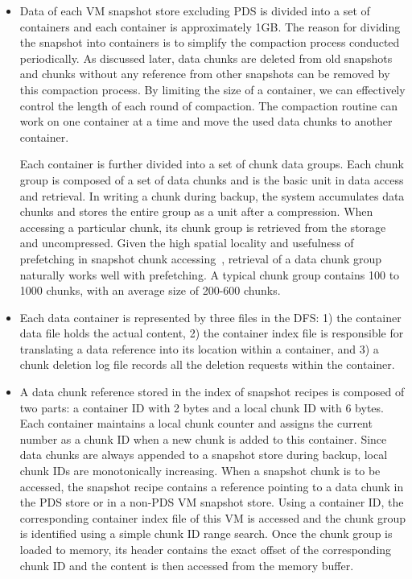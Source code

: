 \begin{itemize}
\item Data of each VM snapshot store excluding PDS is divided into a set of containers and 
each container is approximately 1GB. 
The reason for dividing the snapshot into containers is to simplify the compaction process
conducted periodically. As discussed later, data chunks are deleted from old snapshots
and chunks without any reference from other snapshots can be removed by this compaction process.
By limiting the size of a container, we can effectively control the length of each round of compaction.
The compaction  routine can work on one container at a time and move the used data chunks to another container. 

Each container is further divided into a set of chunk data groups. Each chunk group is composed of
a set of data chunks and is the basic unit in data access and retrieval. 
In writing a chunk during backup, the system accumulates data chunks and stores the entire
group as a unit after a compression.
When accessing a particular chunk, its chunk group is retrieved from the storage
and uncompressed. Given the high spatial locality and usefulness of prefetching  in 
snapshot chunk accessing~\cite{Guo2011,foundation08},
retrieval of  a data chunk  group naturally works well with prefetching. 
A  typical chunk group contains 100 to 1000 chunks, with an average size of 
200-600 chunks.

\item Each data container is represented by three files in the DFS:
1) the container data file holds the actual content, 
2) the container index file is responsible for translating a data reference
into its location within a container, and 
3) a chunk deletion log file records all the deletion requests within  the container.

\item A data chunk reference stored in the index of snapshot recipes
is composed of two parts: a container ID with 2 bytes and a local chunk ID with 6 bytes.
Each container maintains a local  chunk counter and assigns the current number 
as a chunk ID  when  a new chunk is added to this  container. 
Since data chunks are always appended to a snapshot store during backup, 
local chunk IDs are monotonically increasing.
When a snapshot chunk is to be accessed, the snapshot recipe contains a reference pointing to  a data chunk
in the PDS store or in a non-PDS VM snapshot  store. 
Using  a container ID, the corresponding container index file of this VM is accessed and 
the chunk group is identified using a simple chunk ID range search. Once the chunk group is loaded to memory, 
its header contains the exact offset of the corresponding chunk ID and the content is then accessed from the memory buffer.


\end{itemize}

